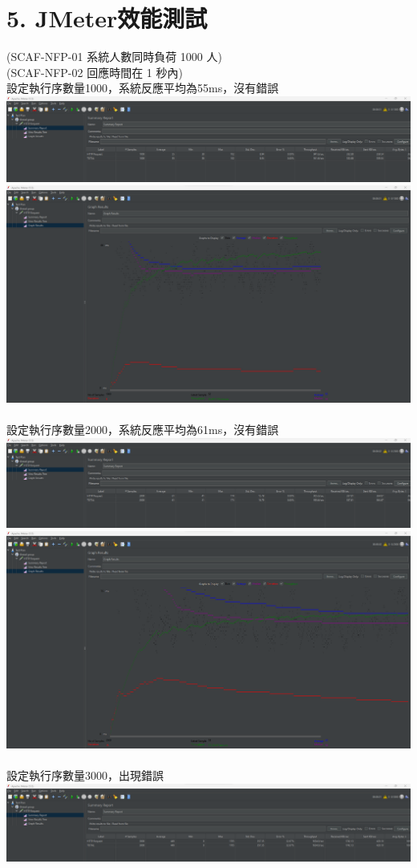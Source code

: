 \documentclass{report}
\begin{document}
\section*{5. JMeter效能測試}
\graphicspath{ {./images} }
(SCAF-NFP-01 系統人數同時負荷 1000 人)\\
(SCAF-NFP-02 回應時間在 1 秒內)\\
設定執行序數量1000，系統反應平均為55ms，沒有錯誤\\
\includegraphics[scale=0.35]{1000_1.png}
\includegraphics[scale=0.35]{1000_2.png}
\\
\newline
\\
設定執行序數量2000，系統反應平均為61ms，沒有錯誤 \\
\includegraphics[scale=0.35]{2000_1.png}
\includegraphics[scale=0.35]{2000_2.png}
\\
\newline
\\
設定執行序數量3000，出現錯誤 \\
\includegraphics[scale=0.35]{3000.png}
\\
\newline
\\
\end{document}
